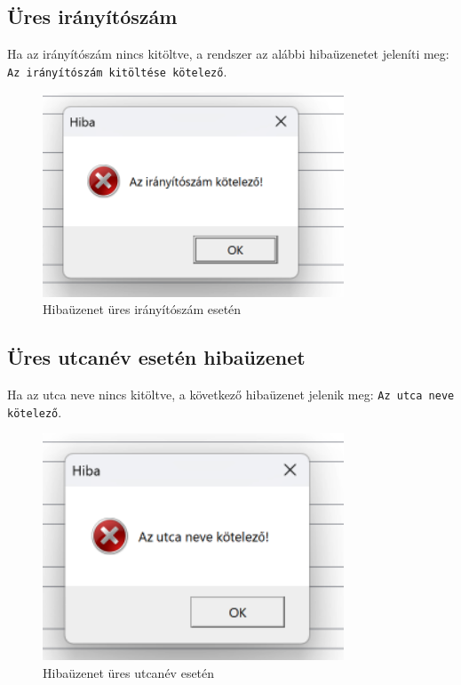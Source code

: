 \documentclass{report}[11pt]
\begin{document}
\subsection{Üres irányítószám}
Ha az irányítószám nincs kitöltve, a rendszer az alábbi hibaüzenetet jeleníti meg: \texttt{Az irányítószám kitöltése kötelező}.

\begin{figure}[H]
    \centering
    \includegraphics[width=0.8\textwidth]{figures/postal_code_not_input_error.png}
    \caption{Hibaüzenet üres irányítószám esetén}
    \label{fig:empty_postal}
\end{figure}

\subsection{Üres utcanév esetén hibaüzenet}
Ha az utca neve nincs kitöltve, a következő hibaüzenet jelenik meg: \texttt{Az utca neve kötelező}.

\begin{figure}[H]
    \centering
    \includegraphics[width=0.8\textwidth]{figures/street_name_not_included_error.png}
    \caption{Hibaüzenet üres utcanév esetén}
    \label{fig:empty_street}
\end{figure}
\end{document}
